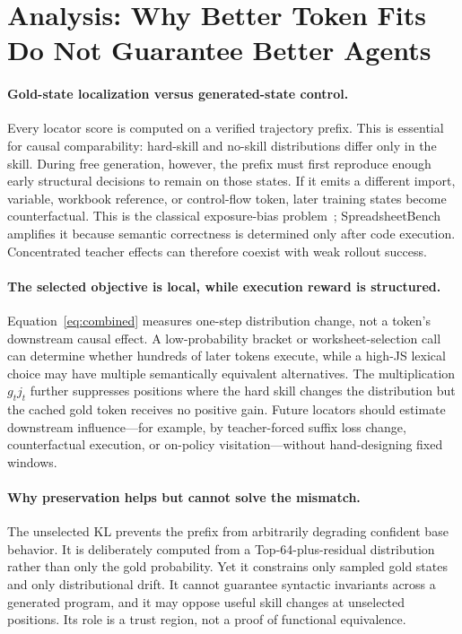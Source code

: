 \section{Analysis: Why Better Token Fits Do Not Guarantee Better Agents}
\label{sec:analysis}

\paragraph{Gold-state localization versus generated-state control.}
Every locator score is computed on a verified trajectory prefix.  This is essential for causal comparability: hard-skill and no-skill distributions differ only in the skill.  During free generation, however, the prefix must first reproduce enough early structural decisions to remain on those states.  If it emits a different import, variable, workbook reference, or control-flow token, later training states become counterfactual.  This is the classical exposure-bias problem~\citep{bengio2015scheduled}; SpreadsheetBench amplifies it because semantic correctness is determined only after code execution.  Concentrated teacher effects can therefore coexist with weak rollout success.

\paragraph{The selected objective is local, while execution reward is structured.}
Equation~\ref{eq:combined} measures one-step distribution change, not a token's downstream causal effect.  A low-probability bracket or worksheet-selection call can determine whether hundreds of later tokens execute, while a high-JS lexical choice may have multiple semantically equivalent alternatives.  The multiplication $g_tj_t$ further suppresses positions where the hard skill changes the distribution but the cached gold token receives no positive gain.  Future locators should estimate downstream influence---for example, by teacher-forced suffix loss change, counterfactual execution, or on-policy visitation---without hand-designing fixed windows.

\paragraph{Why preservation helps but cannot solve the mismatch.}
The unselected KL prevents the prefix from arbitrarily degrading confident base behavior.  It is deliberately computed from a Top-64-plus-residual distribution rather than only the gold probability.  Yet it constrains only sampled gold states and only distributional drift.  It cannot guarantee syntactic invariants across a generated program, and it may oppose useful skill changes at unselected positions.  Its role is a trust region, not a proof of functional equivalence.

